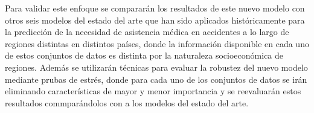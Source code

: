 
Para validar este enfoque se compararán los resultados de este nuevo modelo con otros seis modelos del estado del arte que han sido aplicados históricamente para la predicción de la necesidad de asistencia médica en accidentes a lo largo de regiones distintas en distintos países, donde la información disponible en cada uno de estos conjuntos de datos es distinta por la naturaleza socioeconómica de regiones. Además se utilizarán técnicas para evaluar la robustez del nuevo modelo mediante prubas de estrés, donde para cada uno de los conjuntos de datos se irán eliminando características de mayor y menor importancia y se reevaluarán estos resultados commparándolos con a los modelos del estado del arte.


